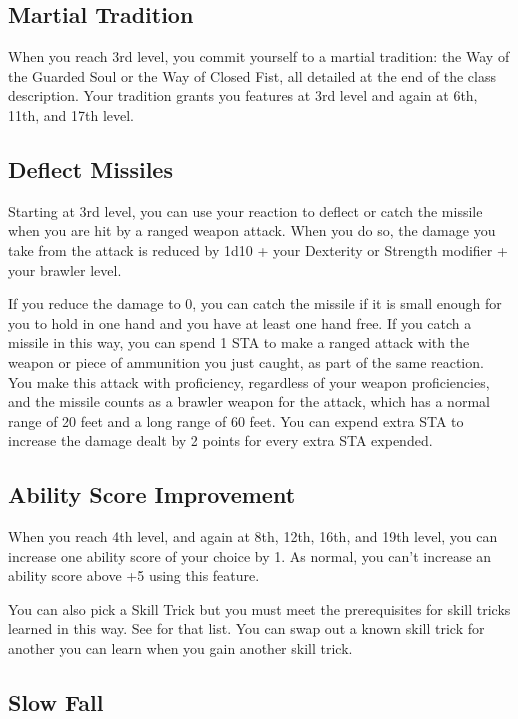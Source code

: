 \subsection{Martial Tradition}

When you reach 3rd level, you commit yourself to a martial tradition: the Way of the Guarded Soul or the Way of Closed Fist, all detailed at the end of the class description. Your tradition grants you features at 3rd level and again at 6th, 11th, and 17th level.

\subsection{Deflect Missiles}

Starting at 3rd level, you can use your reaction to deflect or catch the missile when you are hit by a ranged weapon attack. When you do so, the damage you take from the attack is reduced by 1d10 + your Dexterity or Strength modifier + your brawler level.

If you reduce the damage to 0, you can catch the missile if it is small enough for you to hold in one hand and you have at least one hand free. If you catch a missile in this way, you can spend 1 STA to make a ranged attack with the weapon or piece of ammunition you just caught, as part of the same reaction. You make this attack with proficiency, regardless of your weapon proficiencies, and the missile counts as a brawler weapon for the attack, which has a normal range of 20 feet and a long range of 60 feet. You can expend extra STA to increase the damage dealt by 2 points for every extra STA expended.

\subsection{Ability Score Improvement}

When you reach 4th level, and again at 8th, 12th, 16th, and 19th level, you can increase one ability score of your choice by 1. As normal, you can't increase an ability score above +5 using this feature.

You can also pick a Skill Trick but you must meet the prerequisites for skill tricks learned in this way. See  for that list. You can swap out a known skill trick for another you can learn when you gain another skill trick.

\subsection{Slow Fall}

